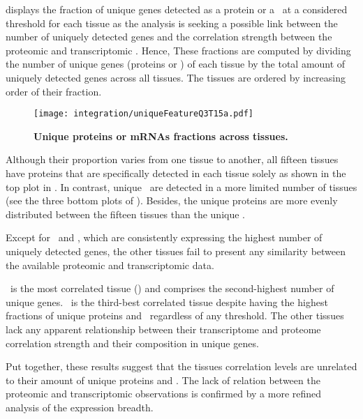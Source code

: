  displays the fraction of unique genes
detected as a protein or a \mRNA\ at a considered threshold for each tissue as
the analysis is seeking a possible link between
the number of uniquely detected genes
and the correlation strength between the proteomic and transcriptomic \treps{}.
Hence, These fractions are computed by dividing
the number of unique genes (proteins or \mRNAs) of each tissue
by the total amount of uniquely detected genes across all tissues.
The tissues are ordered by increasing order of their fraction.\mybr\

\begin{figure}[!htb]
    \texttt{[image: integration/uniqueFeatureQ3T15a.pdf]}\centering
    \vspace{-4mm}
    \caption[Unique proteins or mRNAs fractions across tissues]{\label{fig:UniqueFeatureQ3T15}
    \textbf{Unique proteins or mRNAs fractions across tissues.}
    }
\end{figure}

Although their proportion varies from one tissue to another,
all fifteen tissues have proteins
that are specifically detected in each tissue solely
as shown in the top plot in .
In contrast, unique \mRNAs\ are detected in a more limited number of tissues
(see the three bottom plots of ).
Besides, the unique proteins are more evenly distributed
between the fifteen tissues than the unique \mRNAs.

Except for \Testis\ and \Liver,
which are consistently expressing the highest number of uniquely detected genes,
the other tissues fail to present any similarity
between the available proteomic and transcriptomic data.

\Liver\ is the most correlated tissue ()
and comprises the second-highest number of unique genes.
\Testis\ is the third-best correlated tissue
despite having the highest fractions of unique proteins and \mRNAs\
regardless of any threshold.
The other tissues lack any apparent relationship
between their transcriptome and proteome correlation strength
and their composition in unique genes.\mybr\

Put together, these results suggest that
the tissues correlation levels are unrelated
to their amount of unique proteins and \mRNAs{}.
The lack of relation between the proteomic and transcriptomic observations
is confirmed by a more refined analysis of the expression breadth.

